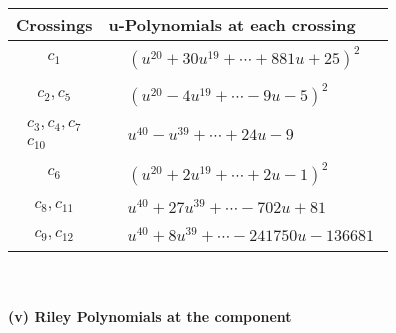 \documentclass[1p]{elsarticle_modified}
\theoremstyle{definition}
\begin{document}
\begin{tabular}{m{50pt}|m{274pt}}
Crossings & \hspace{64pt}u-Polynomials at each crossing \\
\hline $$\begin{aligned}c_{1}\end{aligned}$$&$\begin{aligned}
&(u^{20}+30 u^{19}+\cdots+881 u+25)^{2}
\end{aligned}$\\
\hline $$\begin{aligned}c_{2},c_{5}\end{aligned}$$&$\begin{aligned}
&(u^{20}-4 u^{19}+\cdots-9 u-5)^{2}
\end{aligned}$\\
\hline $$\begin{aligned}c_{3},c_{4},c_{7}\\c_{10}\end{aligned}$$&$\begin{aligned}
&u^{40}- u^{39}+\cdots+24 u-9
\end{aligned}$\\
\hline $$\begin{aligned}c_{6}\end{aligned}$$&$\begin{aligned}
&(u^{20}+2 u^{19}+\cdots+2 u-1)^{2}
\end{aligned}$\\
\hline $$\begin{aligned}c_{8},c_{11}\end{aligned}$$&$\begin{aligned}
&u^{40}+27 u^{39}+\cdots-702 u+81
\end{aligned}$\\
\hline $$\begin{aligned}c_{9},c_{12}\end{aligned}$$&$\begin{aligned}
&u^{40}+8 u^{39}+\cdots-241750 u-136681
\end{aligned}$\\
\hline
\end{tabular}\\~\\
\newpage\renewcommand{\arraystretch}{1}
\flushleft \textbf{(v) Riley Polynomials at the component}\newline \\
\end{document}

